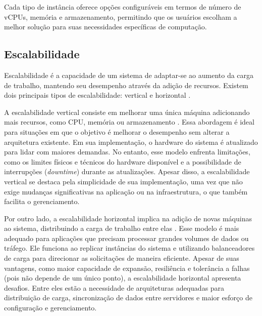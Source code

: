 Cada tipo de instância oferece opções configuráveis em termos de número de vCPUs, memória e armazenamento, permitindo que os usuários escolham a melhor solução para suas necessidades específicas de computação.

\subsection{Escalabilidade}



Escalabilidade é a capacidade de um sistema de adaptar-se ao aumento da carga de trabalho, mantendo seu desempenho através da adição de recursos. Existem dois principais tipos de escalabilidade: vertical e horizontal \cite{what-is-scalability}.

A escalabilidade vertical consiste em melhorar uma única máquina adicionando mais recursos, como CPU, memória ou armazenamento \cite{what-is-scalability}. Essa abordagem é ideal para situações em que o objetivo é melhorar o desempenho sem alterar a arquitetura existente. Em sua implementação, o hardware do sistema é atualizado para lidar com maiores demandas. No entanto, esse modelo enfrenta limitações, como os limites físicos e técnicos do hardware disponível e a possibilidade de interrupções (\emph{downtime}) durante as atualizações. Apesar disso, a escalabilidade vertical se destaca pela simplicidade de sua implementação, uma vez que não exige mudanças significativas na aplicação ou na infraestrutura, o que também facilita o gerenciamento.

Por outro lado, a escalabilidade horizontal implica na adição de novas máquinas ao sistema, distribuindo a carga de trabalho entre elas \cite{what-is-scalability}. Esse modelo é mais adequado para aplicações que precisam processar grandes volumes de dados ou tráfego. Ele funciona ao replicar instâncias do sistema e utilizando balanceadores de carga para direcionar as solicitações de maneira eficiente. Apesar de suas vantagens, como maior capacidade de expansão, resiliência e tolerância a falhas (pois não depende de um único ponto), a escalabilidade horizontal apresenta desafios. Entre eles estão a necessidade de arquiteturas adequadas para distribuição de carga, sincronização de dados entre servidores e maior esforço de configuração e gerenciamento.

